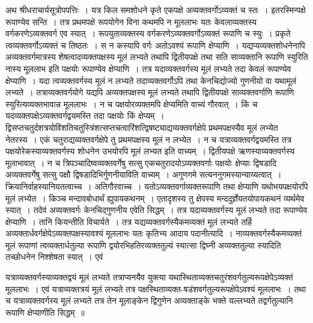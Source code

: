 \documentclass[11pt, openany]{book}
\begin{document}
\vspace{-3mm}
 अथ श्रीधराचार्यसूत्रोपपत्तिः~। यत्र किल समशोधने कृते एकपक्षे 
अव्यक्तवर्गोऽव्यक्तं च स्तः~। इतरस्मिन्पक्षे रूपाण्येव सन्ति~। तत्र 
प्रथमपक्षे रूपयोगेन विना कथमपि न मूललाभः यतः केवलाव्यक्तस्य 
वर्गकरणेऽव्यक्तवर्ग एव स्यात्~। रूपयुताव्यक्तस्य
वर्गकरणेऽव्यक्तवर्गोऽव्यक्तं
\newpage%
\noindent रूपाणि च स्युः~। प्रकृते त्वव्यक्तवर्गोऽव्यक्तं च तिष्ठतः~। स न 
कस्यापि वर्गः अतोऽवश्यं रूपाणि क्षेप्याणि~। यद्यप्यव्यक्तशोधनेनापि 
अव्यक्तवर्गमात्रस्य शेषत्वादव्यक्तपक्षस्य मूलं लभ्यते तथापि द्वितीयपक्षे तथा 
सति साव्यक्तानि रूपाणि स्युरिति नास्य मूललाभ इति पक्षयोः रूपाण्येव 
क्षेप्याणि~। तत्र यदाव्यक्तवर्गस्य मूलं लभ्यते तदा केवलं रूपाण्येव 
क्षेप्याणि~। यदा त्वव्यक्तवर्गस्य मूलं न लभ्यते तदाव्यक्तवर्गोऽपि तथा 
केनचिद्योज्यो गुणनीयो वा यथामूलं लभ्यते~। तत्राव्यक्तवर्गयोगे यद्यपि 
अव्यक्तपक्षस्य मूलं लभ्यते तथापि द्वितीयपक्षे साव्यक्तवर्गाणि रूपाणि 
स्युरित्यव्यक्तभावान्न मूललाभः~। न च पक्षयोरव्यक्तमपि क्षेप्यमिति वाच्यं
गौरवात्~। किं च यदव्यक्तपक्षेऽव्यक्तवर्गद्वयमस्ति तदा पक्षयोः किं 
क्षेप्यम्~। द्विसप्तचतुर्दशत्रयोविंशतिचतुस्त्रिंशत्सप्तचत्वारिंशत्द्विषष्ट्याद्यव्यक्तवर्गक्षेपे प्रथमपक्षस्यैव मूलं लभ्येत नेतरस्य~। एकं चतुराद्यव्यक्तवर्गक्षेपे 
तु प्रथमपक्षस्य मूलं न लभ्येत~। न च यत्राव्यक्तवर्गद्वयमस्ति तत्र 
पक्षयोरेकस्याव्यक्तवर्गस्य शोधनेन उभयोरपि मूलं लभ्यत इति वाच्यम्~। 
द्वितीयपक्षे ऋणस्याव्यक्तवर्गस्य मूलाभावात्~। न च त्रिपञ्चादिष्वव्यक्तवर्गेषु सत्सु एकचतुरादयोऽव्यक्तवर्गाः पक्षयोः क्षेप्याः द्विषडादि 
अव्यक्तवर्गेषु सत्सु पक्षौ द्विषडादिभिर्गुणनीयाविति वाच्यम्~। अगुणगमे 
सत्यननुगमस्यान्याय्यत्वात्~। क्रियानिर्वाहस्यानियतत्वाच्च~। अतिगौरवाच्च~।
यतोऽव्यक्तवर्गाव्यक्तरूपाणि तथा क्षेप्याणि यथोभयपक्षयोरपि मूलं लभ्येत~।
किञ्च मन्दावबोधार्थं ह्युपायकथनम्~। एतादृशस्य तु क्षेपस्य
मन्ददुर्ज्ञेयतयोपायकथनं व्यर्थमेव स्यात्~। तदेवं अव्यक्तवर्गः केनचिद्गुणनीय एवेति
सिद्धम्~। तत्र यदाव्यक्तवर्गस्य मूलं लभ्यते तदा रूपाण्येव क्षेप्याणि~। तानि 
कियन्तीति विचार्यते~। तत्र यद्यव्यक्तवर्गस्यैकमव्यक्तं मूलं लभ्यते तर्हि
अव्यक्तार्धवर्गक्षेपेऽव्यक्तपक्षस्यावश्यं मूललाभः यतः कृतिभ्य आदाय
पदानीत्यादि~। नाव्यक्तवर्गस्यैकमव्यक्तं मूलं रूपाणां त्वव्यक्तार्धतुल्या रूपाणि
द्वयोरभिहतिरव्यक्ततुल्यं स्यात्सा द्विघ्नी अव्यक्ततुल्या स्यादिति तच्छोधनेन निश्शेषता स्यात्~। एवं
\newpage

\noindent यत्राव्यक्तवर्गस्याव्यक्तद्वयं मूलं लभ्यते तत्राप्यनयैव युक्त्या
यथास्थिताव्यक्तचतुरंशवर्गतुल्यरूपक्षेपेऽव्यक्तं मूललाभः~। एवं यत्राव्यक्तत्रयं मूलं
लभ्यते तत्र पक्षस्थिताव्यक्त-षडंशवर्गतुल्यरूपक्षेपेऽवश्यं मूललाभः~। तथा च
यत्राव्यक्तवर्गस्य मूलं लभ्यते तत्र तेन मूलाङ्केन द्विगुणेन अव्यक्ताङ्के भक्ते यल्लभ्यते
तद्वर्गतुल्यानि रूपाणि क्षेप्याणीति सिद्धम्~॥ \\
\end{document}
